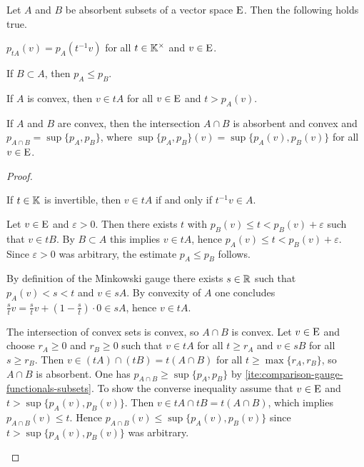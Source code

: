 \begin{lemma}
  Let  $A$ and $B$ be absorbent subsets of a vector space $\mathrm{E}$. Then
  the following holds true.
  \begin{romanlist}
  \item
    $p_{tA}(v) =  p_A(t^{-1} v)$ for all $t\in \mathbb{K}^\times$ and $v\in \mathrm{E}$.
  \item\label{ite:comparison-gauge-functionals-subsets}
    If $B\subset A$, then $p_A \leq p_B$.
  \item
    If $A$ is convex, then $v \in tA$ for all $v\in \mathrm{E}$ and $t > p_A(v)$. 
  \item
    If $A$ and $B$ are convex, then the intersection $A\cap B$ is absorbent and convex and
    $p_{A\cap B} = \sup \{ p_A,p_B\}$, where $\sup \{ p_A,p_B\} (v) = \sup \{ p_A (v) ,p_B (v) \}$
    for all  $v\in \mathrm{E}$.  
  \end{romanlist}
\end{lemma}

\begin{proof}
  \begin{adromanlist}
  \item
    If $t\in \mathbb{K}$ is invertible, then $v \in tA$ if and only if $t^{-1}v \in A$.
  \item
    Let $v\in \mathrm{E}$ and $\varepsilon >0$. Then there exists $t$ with
    $p_B(v) \leq t < p_B(v) + \varepsilon$ such that $v \in tB$. By $B\subset A$ this implies
    $v \in tA$, hence $p_A(v) \leq t < p_B(v) + \varepsilon$. Since $\varepsilon >0$
    was arbitrary, the estimate $p_A \leq p_B$ follows.
  \item
    By definition of the Minkowski gauge there exists $s \in \mathbb{R}$ such that $p_A(v)< s <t$ and  $v \in sA$.
    By convexity of $A$ one concludes $\frac st v = \frac st v + \left( 1 - \frac st \right) \cdot 0 \in sA$, hence
    $v \in tA$.  
  \item
    The intersection of convex sets is convex, so $A\cap B$ is convex.
    Let $v\in \mathrm{E}$ and choose $r_A\geq 0$ and $r_B\geq 0$ such that 
    $v \in tA$ for all $t\geq r_A$ and $v \in sB $ for all $s\geq r_B$.
    Then $v \in (tA)\cap (tB) = t(A\cap B) $ for all $t\geq \max\{r_A,r_B\}$,
    so $A\cap B$ is absorbent.
    One has $p_{A\cap B} \geq  \sup \{ p_A,p_B\}$ by \ref{ite:comparison-gauge-functionals-subsets}.
    To show the converse inequality assume that  $v \in \mathrm{E}$ and $t > \sup \{ p_A (v) ,p_B (v)\}$.
    Then $v \in tA \cap tB = t(A\cap B)$, which implies $p_{A\cap B} (v)\leq t$. Hence
    $p_{A\cap B} (v) \leq  \sup \{ p_A (v) ,p_B (v)\}$ since $t > \sup \{ p_A (v) ,p_B (v)\}$
    was arbitrary.
  \end{adromanlist}
\end{proof}

